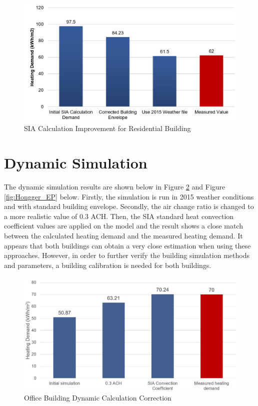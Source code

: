 \documentclass[a4paper, oneside]{discothesis}
\begin{document}
		\begin{figure}[htbp]
		\centering
		\includegraphics[scale=0.46]{Residential_SIA.jpg}
		\caption{SIA Calculation Improvement for Residential Building}
		\label{fig:Hongger_SIA}
		\end{figure}
		
		
	\newpage		  
	\section{Dynamic Simulation}		
			The dynamic simulation results are shown below in Figure \ref{fig:Sumatra_EP} and Figure \ref{fig:Hongger_EP} below. Firstly, the simulation is run in 2015 weather conditions and with standard building envelope. Secondly, the air change ratio is changed to a more realistic value of 0.3 ACH. Then, the SIA standard heat convection coefficient values are applied on the model and the result shows a close match between the calculated heating demand and the measured heating demand. It appears that both buildings can obtain a very close estimation when using these approaches. However, in order to further verify the building simulation methods and parameters, a building calibration is needed for both buildings.
		

		\begin{figure}[htbp]
		\centering
		\includegraphics[scale=0.5]{Office_EP.jpg}
		\caption{Office Building Dynamic Calculation Correction}
		\label{fig:Sumatra_EP}
		\end{figure}
\end{document}

